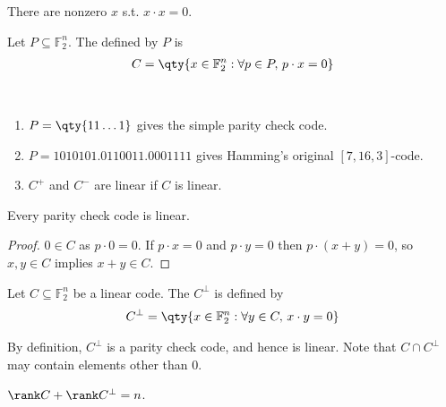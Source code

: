 \begin{warning}
    There are nonzero $x$ s.t. $x \cdot x = 0$.
\end{warning}

\begin{definition}
    Let $P \subseteq \mathbb F_2^n$.
    The  defined by $P$ is
    \begin{align*}
        C = \qty{x \in \mathbb F_2^n : \forall p \in P,\,p \cdot x = 0}
    \end{align*}
\end{definition}

\begin{example} ~\vspace*{-1.5\baselineskip}
    \begin{enumerate}
        \item $P = \qty{11\dots 1}$ gives the simple parity check code.
        \item $P = \qty{1010101, 0110011, 0001111}$ gives Hamming's original $[7,16,3]$-code.
        \item $C^+$ and $C^-$ are linear if $C$ is linear.
    \end{enumerate}
\end{example}

\begin{lemma}
    Every parity check code is linear.
\end{lemma}

\begin{proof}
    $0 \in C$ as $p \cdot 0 = 0$.
    If $p \cdot x = 0$ and $p \cdot y = 0$ then $p \cdot (x + y) = 0$, so $x, y \in C$ implies $x + y \in C$.
\end{proof}

\begin{definition}
    Let $C \subseteq \mathbb F_2^n$ be a linear code.
    The  $C^\perp$ is defined by
    \begin{align*}
        C^\perp = \qty{x \in \mathbb F_2^n : \forall y \in C,\, x \cdot y = 0}
    \end{align*}
\end{definition}

By definition, $C^\perp$ is a parity check code, and hence is linear.
Note that $C \cap C^\perp$ may contain elements other than 0.

\begin{lemma}
    $\rank C + \rank C^\perp = n$.
\end{lemma}

